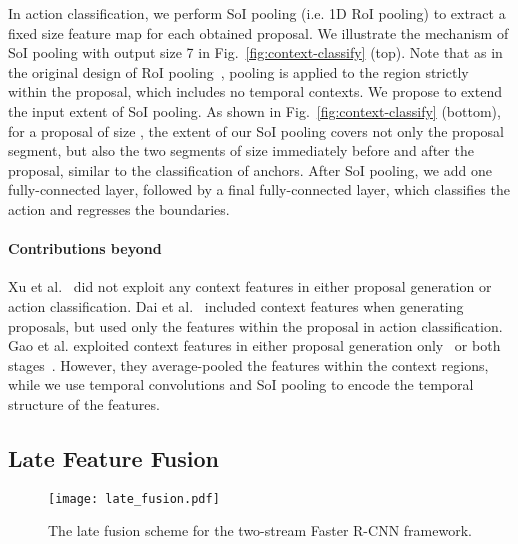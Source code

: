 \documentclass[10pt,twocolumn,letterpaper]{article}
\begin{document}
In action classification, we perform SoI pooling (i.e. 1D RoI pooling) to
extract a fixed size feature map for each obtained proposal. We illustrate the
mechanism of SoI pooling with output size 7 in Fig.~\ref{fig:context-classify}
(top). Note that as in the original design of RoI
pooling~\cite{girshick:iccv2015,ren:nips2015}, pooling is applied to the region
strictly within the proposal, which includes no temporal contexts. We propose
to extend the input extent of SoI pooling. As shown in
Fig.~\ref{fig:context-classify} (bottom), for a proposal of size , the
extent of our SoI pooling covers not only the proposal segment, but also the
two segments of size  immediately before and after the proposal, similar
to the classification of anchors. After SoI pooling, we add one fully-connected
layer, followed by a final fully-connected layer, which classifies the action
and regresses the boundaries.

\vspace{-3mm}

\paragraph{Contributions
beyond~\cite{dai:iccv2017,gao:bmvc2017,gao:iccv2017,xu:iccv2017}} Xu et
al.~\cite{xu:iccv2017} did not exploit any context features in either proposal
generation or action classification. Dai et al.~\cite{dai:iccv2017} included
context features when generating proposals, but used only the features within
the proposal in action classification. Gao et al. exploited context features in
either proposal generation only~\cite{gao:iccv2017} or both
stages~\cite{gao:bmvc2017}. However, they average-pooled the features within
the context regions, while we use temporal convolutions and SoI pooling to
encode the temporal structure of the features.

\subsection{Late Feature Fusion}
\label{sec:fusion}

\begin{figure}[t]
\centering
 \texttt{[image: late\_fusion.pdf]}
 \vspace{-1mm} \caption{\small The late fusion scheme for the two-stream Faster R-CNN
framework.}
 \vspace{-2mm} \label{fig:late_fusion}
\end{figure}
\end{document}

